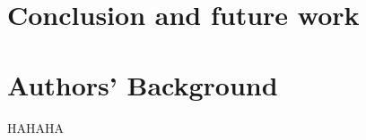\documentclass{sig-alternate}
\begin{document}



\section{Conclusion and future work}
\label{sec:future}





\newpage    
\section{Authors' Background}

HAHAHA
\end{document}

